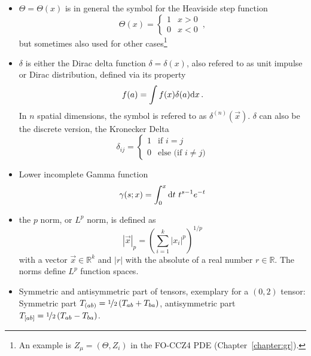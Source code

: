 \begin{itemize}
	
	\item $\Theta=\Theta(x)$ is in general the symbol for
	   the Heaviside step function
	   \begin{equation}
	  \Theta(x)=\begin{cases}
	  1 & x > 0 \\ 0 & x < 0
	  \end{cases} \,,
	  \end{equation}
	  but sometimes also used for other cases\footnote{
	    An example is $Z_\mu = (\Theta, Z_i)$ in the
	    FO-CCZ4 PDE (Chapter~\ref{chapter:gr}).
      }
	\item $\delta$ is either the Dirac delta function
	  $\delta=\delta(x)$, also refered to as unit impulse
	  or Dirac distribution, defined via its property
	  \begin{equation}
	  f(a) = \int f(x) \delta(a) \mathrm{d} x \,.
	  \end{equation}
	  In $n$ spatial dimensions, the symbol
	  is refered to as $\delta^{(n)}(\vec x)$.
	  $\delta$ can also be the discrete version, \ie
	  the Kronecker Delta
	  \begin{equation}
	  \delta_{ij} =
	  \begin{cases}
	  1 & \text{if } i = j \\
	  0 & \text{else (if } i \neq j \text{)}
	  \end{cases}
	  \end{equation}
	
	\item Lower incomplete Gamma function
	\begin{equation}
	\gamma(s;x) = \int_0^x \mathrm{d} t ~ t^{s-1} e^{-t}
	\end{equation}
	
	\item the $p$ norm, or $L^p$ norm, is defined as
	\begin{equation}\label{apx.def.lpnorm}
	  \left| \vec x \right|_p = \left( \sum_{i=1}^k |x_i|^p \right)^{1/p}
	\end{equation}
	with a vector $\vec x \in \mathbb R^k$ and $|r|$ with the absolute of
	a real number $r\in \mathbb R$. The norms define
    $L^p$ function spaces.
    
    \item Symmetric and antisymmetric part of tensors, exemplary for a $(0,2)$ tensor:
       Symmetric part $T_{(ab)} = \nicefrac{1}{2} \left( T_{ab} + T_{ba} \right)$,
       antisymmetric part $T_{[ab]} = \nicefrac 12 \left( T_{ab} - T_{ba} \right)$.
    

\end{itemize}
